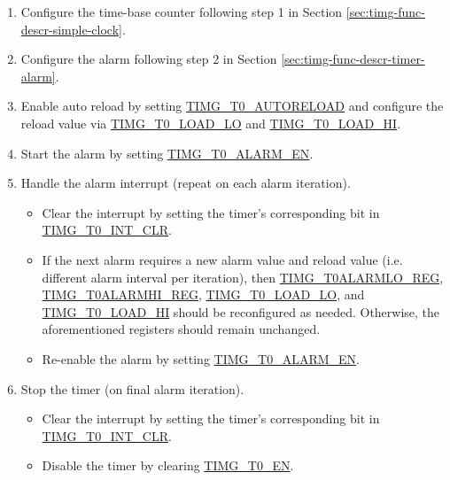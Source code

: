 \documentclass[main\_\_EN.tex]{subfiles}
\begin{document}
\begin{enumerate}
    \item Configure the time-base counter following step 1 in Section \ref{sec:timg-func-descr-simple-clock}.
    \item Configure the alarm following step 2 in Section \ref{sec:timg-func-descr-timer-alarm}.
    \item Enable auto reload by setting \hyperref[fielddesc:TIMGTXAUTORELOAD]{TIMG\_T0\_AUTORELOAD} and configure the reload value via \hyperref[fielddesc:TIMGTXLOADLO]{TIMG\_T0\_LOAD\_LO} and \hyperref[fielddesc:TIMGTXLOADHI]{TIMG\_T0\_LOAD\_HI}.
    \item Start the alarm by setting \hyperref[fielddesc:TIMGTXALARMEN]{TIMG\_T0\_ALARM\_EN}.
    \item Handle the alarm interrupt (repeat on each alarm iteration).
    \begin{itemize}
        \item Clear the interrupt by setting the timer's corresponding bit in \hyperref[fielddesc:TIMGT0INTCLR]{TIMG\_T0\_INT\_CLR}.
        \item If the next alarm requires a new alarm value and reload value (i.e. different alarm interval per iteration), then \hyperref[regdesc:TIMGTXALARMLOREG]{TIMG\_T0ALARMLO\_REG}, \hyperref[regdesc:TIMGTXALARMHIREG]{TIMG\_T0ALARMHI\_REG}, \hyperref[fielddesc:TIMGTXLOADLO]{TIMG\_T0\_LOAD\_LO}, and \hyperref[fielddesc:TIMGTXLOADHI]{TIMG\_T0\_LOAD\_HI} should be reconfigured as needed. Otherwise, the aforementioned registers should remain unchanged.
        \item Re-enable the alarm by setting \hyperref[fielddesc:TIMGTXALARMEN]{TIMG\_T0\_ALARM\_EN}.
    \end{itemize}
    \item Stop the timer (on final alarm iteration).
    \begin{itemize}
        \item Clear the interrupt by setting the timer's corresponding bit in \hyperref[fielddesc:TIMGT0INTCLR]{TIMG\_T0\_INT\_CLR}.
        \item Disable the timer by clearing \hyperref[fielddesc:TIMGTXEN]{TIMG\_T0\_EN}.  
    \end{itemize}
\end{enumerate}
\end{document}
